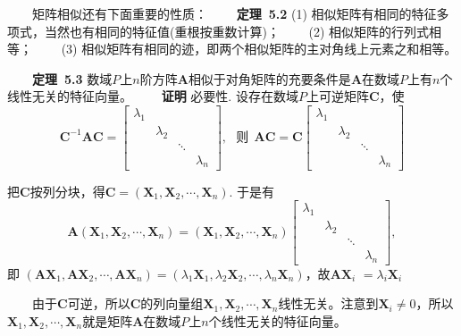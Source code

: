 \documentclass[compress,mathserif,cjk]{beamer}
\theoremstyle{remark}
\numberwithin{equation}{section}
\newcommand{\hei}{\bf}      %
\begin{document}
\begin{CJK}{UTF8}{gbsn}
\begin{frame}
\ \ \ \ 矩阵相似还有下面重要的性质：
\vskip 5pt
\ \ \ \ {\hei 定理~5.2} (1) 相似矩阵有相同的特征多项式，当然也有相同的特征值(重根按重数计算)；
\vskip 2pt
\ \ \ \ (2) 相似矩阵的行列式相等；
\vskip 2pt
\ \ \ \ (3) 相似矩阵有相同的迹，即两个相似矩阵的主对角线上元素之和相等。
\end{frame}

\begin{frame}
\ \ \ \ {\hei 定理~5.3} 数域$P$上$n$阶方阵$\bm A$相似于对角矩阵的充要条件是$\bm A$在数域$P$上有$n$个线性无关的特征向量。
\pause\vskip 10pt
\ \ \ \ {\hei 证明} 必要性. 设存在数域$P$上可逆矩阵$\bm C$，使
$$\bm C^{-1}\bm{AC}=\left[\begin{matrix}\lambda_1&&&\\&\lambda_2&&\\&&\ddots&\\&&&\lambda_n\end{matrix}\right],~~~\mbox{则}~~
\bm{AC}=\bm C\left[\begin{matrix}\lambda_1&&&\\&\lambda_2&&\\&&\ddots&\\&&&\lambda_n\end{matrix}\right]$$
\end{frame}

\begin{frame}
把$\bm C$按列分块，得$\bm C=(\bm X_1,\bm X_2,\cdots,\bm X_n)$. 于是有
$$\bm A(\bm X_1,\bm X_2,\cdots,\bm X_n)=(\bm X_1,\bm X_2,\cdots,\bm X_n)\left[\begin{matrix}\lambda_1&&&\\&\lambda_2&&\\&&\ddots&\\&&&\lambda_n\end{matrix}\right],$$
即
$(\bm{AX}_1,\bm{AX}_2,\cdots,\bm{AX}_n)=(\lambda_1\bm X_1,\lambda_2\bm X_2,\cdots,\lambda_n\bm X_n)$，故$\bm{AX}_i$ $=\lambda_i\bm X_i$

\pause\vskip 5pt
\ \ \ \ 由于$\bm C$可逆，所以$\bm C$的列向量组$\bm X_1,\bm X_2,\cdots,\bm X_n$线性无关。注意到$\bm X_i\neq0$，所以$\bm X_1,\bm X_2,\cdots,\bm X_n$就是矩阵$\bm A$在数域$P$上$n$个线性无关的特征向量。

\end{frame}


\end{CJK}
\end{document}
